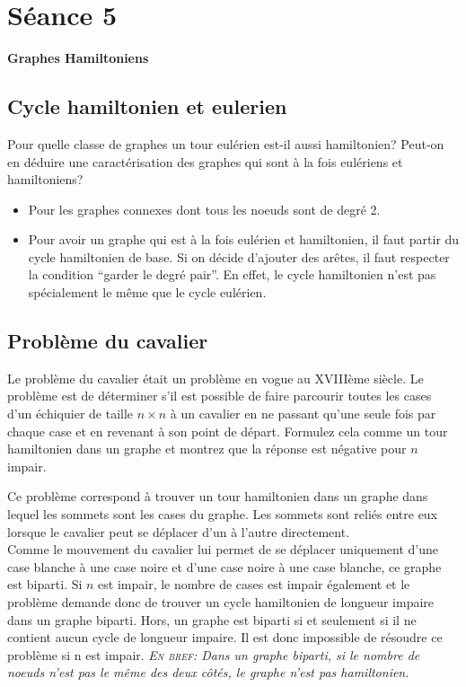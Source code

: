 \section{Séance 5}

\textbf{Graphes Hamiltoniens}

\subsection{Cycle hamiltonien et eulerien}
Pour quelle classe de graphes un tour eulérien est-il aussi hamiltonien? Peut-on en déduire une caractérisation des graphes qui sont à la fois eulériens et hamiltoniens?
\begin{solution}
\begin{itemize}
\item Pour les graphes connexes dont tous les noeuds sont de degré 2.
\item Pour avoir un graphe qui est à la fois eulérien et hamiltonien, il faut partir du cycle hamiltonien de base. Si on décide d'ajouter des arêtes, il faut respecter la condition ``garder le degré pair''. En effet, le cycle hamiltonien n'est pas spécialement le même que le cycle eulérien.
\end{itemize}
\end{solution}

\subsection{Problème du cavalier}
Le problème du cavalier était un problème en vogue au XVIIIème siècle. Le problème est de déterminer s'il est possible de faire parcourir toutes les cases d'un échiquier de taille $n \times n$ à un cavalier en ne passant qu'une seule fois par chaque case et en revenant à son point de départ. Formulez cela comme un tour hamiltonien dans un graphe et montrez que la réponse est négative pour $n$ impair.
\begin{solution}
Ce problème correspond à trouver un tour hamiltonien dans un graphe dans lequel les sommets sont les cases du graphe. Les sommets sont reliés entre eux lorsque le cavalier peut se déplacer d'un à l'autre directement.\\
Comme le mouvement du cavalier lui permet de se déplacer uniquement d'une case blanche à une case noire et d'une case noire à une case blanche, ce graphe est biparti.
Si $n$ est impair, le nombre de cases est impair également et le problème demande donc de trouver un cycle hamiltonien de longueur impaire dans un graphe biparti. Hors, un graphe est biparti si et seulement si il ne contient aucun cycle de longueur impaire. Il est donc impossible de résoudre ce problème si n est impair.
\textit{\textsc{En bref: }Dans un graphe biparti, si le nombre de noeuds n'est pas le même des deux côtés, le graphe n'est pas hamiltonien.}
\end{solution}

